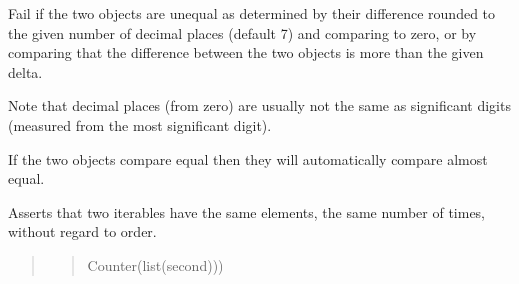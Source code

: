 \documentclass[letterpaper,10pt,english]{sphinxmanual}
\begin{document}
\begin{fulllineitems}
\begin{fulllineitems}
\begin{description}
\end{description}

\end{fulllineitems}


\begin{fulllineitems}
\label{\detokenize{_autosummary/tests.test_unit.test_sqlite:tests.test_unit.test_sqlite.assertAlmostEqual}}
\pysigstartsignatures
{}
\pysigstopsignatures
\sphinxAtStartPar
Fail if the two objects are unequal as determined by their
difference rounded to the given number of decimal places
(default 7) and comparing to zero, or by comparing that the
difference between the two objects is more than the given
delta.

\sphinxAtStartPar
Note that decimal places (from zero) are usually not the same
as significant digits (measured from the most significant digit).

\sphinxAtStartPar
If the two objects compare equal then they will automatically
compare almost equal.

\end{fulllineitems}


\begin{fulllineitems}
\label{\detokenize{_autosummary/tests.test_unit.test_sqlite:tests.test_unit.test_sqlite.assertCountEqual}}
\pysigstartsignatures
{}
\pysigstopsignatures
\sphinxAtStartPar
Asserts that two iterables have the same elements, the same number of
times, without regard to order.
\begin{quote}
\begin{quote}
\begin{description}
\sphinxAtStartPar
Counter(list(second)))


\end{description}
\end{quote}
\end{quote}
\end{fulllineitems}
\end{fulllineitems}
\end{document}

